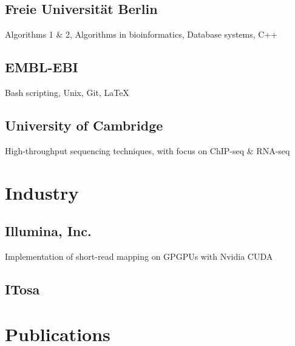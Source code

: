 \documentclass{klmr-cv}
\newcommand*\cpp{C++}
\begin{document}
\subsection{Freie Universität Berlin}

\date{2008--2011}
\item{}
\item{Algorithms 1 \& 2, Algorithms in bioinformatics, Database systems, \cpp}

\subsection{EMBL-EBI}

\date{2011--2014}
\item{}
\item{Bash scripting, Unix, Git, \LaTeX}

\subsection{University of Cambridge}

\date{2013--2015}
\item{}
\item{High-throughput sequencing techniques, with focus on ChIP-seq \& RNA-seq}

\section{Industry}

\subsection{Illumina, Inc.}

\date{Oct 2008--Feb 2009}
\item{}
\item{Implementation of short-read mapping on GPGPUs with Nvidia CUDA}

\subsection{ITosa}

\date{Jan 2007--Jan 2008}
\item{}

\section{Publications}
\end{document}
